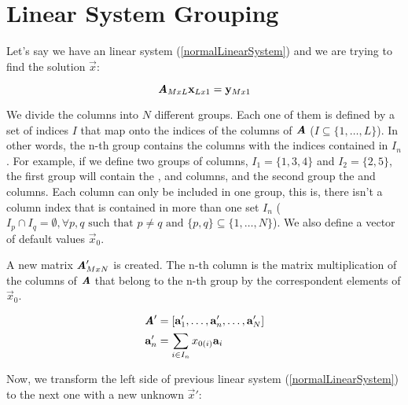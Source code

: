\chapter{Linear System Grouping}

Let's say we have an linear system (\autoref{normalLinearSystem}) and we are trying to find the solution $\vec{x}$:

\begin{equation}
\bm{\mathit{A}}_{MxL} \mathbf{x}_{Lx1} = \mathbf{y}_{Mx1}
\label{normalLinearSystem}
\end{equation}

We divide the columns into $N$ different groups. Each one of them is defined by a set of indices $I$ that map onto the indices of the columns of $\bm{\mathit{A}}$ ($I \subseteq \{1, \ldots, L\}$). In other words, the n-th group contains the columns with the indices contained in $I_n$. For example, if we define two groups of columns, $I_1 = \{1, 3, 4\}$ and $I_2 = \{2, 5\}$, the first group will contain the ,  and  columns, and the second group the  and  columns. Each column can only be included in one group, this is, there isn't a column index that is contained in more than one set $I_n$ ($I_p \cap I_q = \emptyset, \forall p, q \text{ such that } p \neq q \text{ and } \{p, q\} \subseteq \{1, \ldots, N\}$). We also define a vector of default values $\vec{x}_0$.

A new matrix $\bm{\mathit{A}}'_{MxN}$ is created. The n-th column is the matrix multiplication of the columns of $\bm{\mathit{A}}$ that belong to the n-th group by the correspondent elements of $\vec{x}_0$.

\begin{equation}
\begin{aligned}
\bm{\mathit{A}}' &= [\mathbf{a}'_1,\ldots, \mathbf{a}'_n, \ldots, \mathbf{a}'_N] \\
\mathbf{a}'_n &=
\sum_{i \in I_n} x_{0(i)} \mathbf{a}_i
\end{aligned}
\end{equation}

Now, we transform the left side of previous linear system (\autoref{normalLinearSystem}) to the next one with a new unknown $\vec{x}'$:

